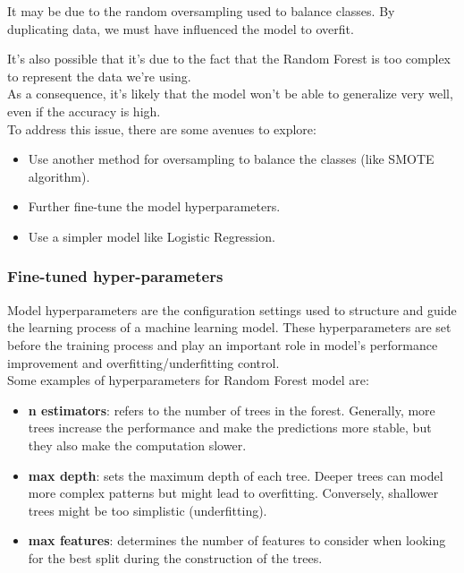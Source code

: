 \documentclass[a4paper,12pt]{article}
\begin{document}
It may be due to the random oversampling used to balance classes. By duplicating data, we must have influenced the model to overfit. 

It's also possible that it's due to the fact that the Random Forest is too complex to represent the data we're using.\\
  
As a consequence, it's likely that the model won't be able to generalize very well, even if the accuracy is high.\\ 
To address this issue, there are some avenues to explore:
\begin{itemize}
    \item Use another method for oversampling to balance the classes (like SMOTE algorithm).
    \item Further fine-tune the model hyperparameters.
    \item Use a simpler model like Logistic Regression.
\end{itemize}




\subsubsection{Fine-tuned hyper-parameters}


Model hyperparameters are the configuration settings used to structure and guide the learning process of a machine learning model. These hyperparameters are set before the training process and play an important role in model's performance improvement and overfitting/underfitting control.\\

Some examples of hyperparameters for Random Forest model are:
\begin{itemize}
    \item \textbf{n estimators}: refers to the number of trees in the forest. Generally, more trees increase the performance and make the predictions more stable, but they also make the computation slower.
    \item \textbf{max depth}: sets the maximum depth of each tree. Deeper trees can model more complex patterns but might lead to overfitting. Conversely, shallower trees might be too simplistic (underfitting).
    \item \textbf{max features}: determines the number of features to consider when looking for the best split during the construction of the trees.
\end{itemize}
\end{document}
